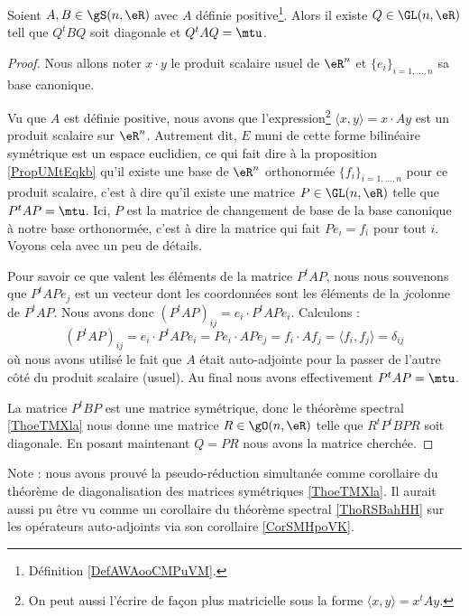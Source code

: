 \begin{corollary}  \label{CorNHKnLVA}
    Soient \( A,B\in \gS(n,\eR)\) avec \( A\) définie positive\footnote{Définition \ref{DefAWAooCMPuVM}.}. Alors il existe \( Q\in \GL(n,\eR)\) tell que \( Q^tBQ\) soit diagonale et \( Q^tAQ=\mtu\).
\end{corollary}

\begin{proof}
    Nous allons noter \( x\cdot y\) le produit scalaire usuel de \( \eR^n\) et \( \{ e_i \}_{i=1,\ldots, n}\) sa base canonique.

    Vu que \( A\) est définie positive, nous avons que l'expression\footnote{On peut aussi l'écrire de façon plus matricielle sous la forme \( \langle x, y\rangle =x^tAy\).} \( \langle x, y\rangle =x\cdot Ay\) est un produit scalaire sur \( \eR^n\). Autrement dit, \( E\) muni de cette forme bilinéaire symétrique est un espace euclidien, ce qui fait dire à la proposition \ref{PropUMtEqkb} qu'il existe une base de \( \eR^n\) orthonormée \( \{ f_i \}_{i=1,\ldots, n}\) pour ce produit scalaire, c'est à dire qu'il existe une matrice \( P\in \GL(n,\eR)\) telle que \( P^tAP=\mtu\). Ici, \( P\) est la matrice de changement de base de la base canonique à notre base orthonormée, c'est à dire la matrice qui fait \( Pe_i=f_i\) pour tout \( i\). Voyons cela avec un peu de détails.

    Pour savoir ce que valent les éléments de la matrice \( P^tAP\), nous nous souvenons que \( P^tAPe_j\) est un vecteur dont les coordonnées sont les éléments de la \( j\)\ieme colonne de \( P^tAP\). Nous avons donc \( (P^tAP)_{ij}=e_i\cdot P^tAPe_i\). Calculons :
    \begin{equation}
            (P^tAP)_{ij}=e_i\cdot P^tAPe_i
            =Pe_i\cdot APe_j
        =f_i\cdot Af_j
        =\langle f_i, f_j\rangle 
        =\delta_{ij}
    \end{equation}
    où nous avons utilisé le fait que \( A\) était auto-adjointe pour la passer de l'autre côté du produit scalaire (usuel). Au final nous avons effectivement \( P^tAP=\mtu\).

    La matrice \( P^tBP\) est une matrice symétrique, donc le théorème spectral \ref{ThoeTMXla} nous donne une matrice \( R\in \gO(n,\eR)\) telle que \( R^tP^tBPR\) soit diagonale. En posant maintenant \( Q=PR\) nous avons la matrice cherchée.
\end{proof}
Note : nous avons prouvé la pseudo-réduction simultanée comme corollaire du théorème de diagonalisation des matrices symétriques \ref{ThoeTMXla}. Il aurait aussi pu être vu comme un corollaire du théorème spectral \ref{ThoRSBahHH} sur les opérateurs auto-adjoints via son corollaire \ref{CorSMHpoVK}.

